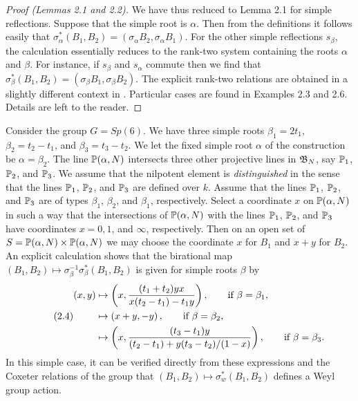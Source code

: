 \documentclass{amsart}
\begin{document}
\begin{proof}[Proof (Lemmas 2.1 and 2.2)]
We have thus reduced to Lemma 2.1 for simple reflections.
Suppose that the simple root is $\alpha$.  Then from the definitions it follows
easily that $\sigma^*_\alpha (B_1,B_2) = (\sigma_\alpha B_2,
\sigma_\alpha B_1)$.  For the other
simple reflections $s_\beta$, the calculation essentially reduces to the
rank-two system containing the roots $\alpha$ and $\beta$.  For instance,
if $s_\beta$ and $s_\alpha$ commute then we find that 
$\sigma^*_\beta (B_1,B_2) = (\sigma_\beta B_1,
\sigma_\beta B_2)$.  
The explicit rank-two relations are obtained
in a slightly different
context in \cite{H3,VI.1.6}.
Particular cases are found in Examples 2.3 and 2.6.
Details are left to the reader.
\end{proof}

  Consider the group $G=Sp(6)$.  We have three
simple roots $\beta_1 = 2t_1$,
$\beta_2 = t_2-t_1$, and $\beta_3 = t_3-t_2$.  We let the fixed simple
root $\alpha$ of the construction be $\alpha=\beta_2$.  
The line
${\Bbb P}(\alpha,N)$ intersects three other projective lines in ${\frak B}_N$, say
${\Bbb P}_1$, ${\Bbb P}_2$, and ${\Bbb P}_3$.  We assume that the nilpotent element
is {\it distinguished} in the sense that the lines ${\Bbb P}_1$, ${\Bbb P}_2$, and
${\Bbb P}_3$ are defined over $k$.  Assume that the lines ${\Bbb P}_1$, ${\Bbb P}_2$, and
${\Bbb P}_3$ are of types $\beta_1$, $\beta_2$, and $\beta_1$, respectively.
Select a coordinate $x$ on ${\Bbb P}(\alpha,N)$ 
in such a way that the intersections
of ${\Bbb P}(\alpha,N)$ with the lines ${\Bbb P}_1$, ${\Bbb P}_2$, and ${\Bbb P}_3$ have
coordinates $x=0,1$, and $\infty$, respectively.  Then on an open set of $S =
{\Bbb P}(\alpha,N)\times {\Bbb P}(\alpha,N)$ we may choose the coordinate $x$
for $B_1$ and $x+y$ for $B_2$.  An explicit calculation shows that
the birational map $(B_1,B_2)\mapsto \sigma_\beta^{-1}\sigma^*_\beta(B_1,B_2)$
is given for simple roots $\beta$ by
\begin{equation}\tag {2.4}
\begin{aligned}
(x,y) &\mapsto \left(x, {(t_1+t_2) y x\over  x (t_2-t_1) -  t_1 y}\right),
    \qquad \hbox{if } \beta=\beta_1,\\
      &\mapsto \left(x+y,-y\right),\qquad \hbox{if } \beta=\beta_2,\\
      &\mapsto \left(x,{(t_3-t_1)y\over (t_2-t_1) + y (t_3-t_2)/(1-x)}\right),
      \qquad \hbox{if } \beta=\beta_3.
\end{aligned}
\end{equation}
In this simple case, it can be verified directly from these expressions
and the Coxeter relations of the group
that $(B_1,B_2)\mapsto \sigma^*_w(B_1,B_2)$ defines a Weyl group action.
\endproclaim
\end{document}
